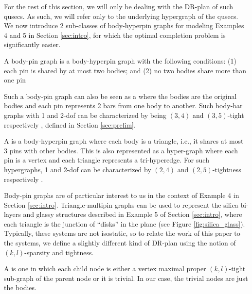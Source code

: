 For the rest of this section, we will only be dealing with the DR-plan of
such qusecs. As such, we will refer only to the underlying hypergraph of the qusecs. We now
introduce 2 sub-classes of body-hyperpin graphs for modeling Examples 4 and
5 in Section \ref{sec:intro}, for which the optimal completion problem is
significantly easier.

\begin{definition}
\label{def:body-pin}
    A body-pin graph is a body-hyperpin graph with the following conditions:
    (1) each pin is shared by at most two bodies; and
    (2) no two bodies share more than one pin

    Such a body-pin graph can also be seen as a  where
    the bodies are the original bodies and each pin represents 2 bars from
    one body to another. Such body-bar graphs with 1 and 2-dof can be
    characterized by being $(3,4)$ and $(3,5)$-tight respectively
    \cite{Lee:2007:PGA} \cite{streinu2009sparse},
defined in Section  \ref{sec:prelim}.
\end{definition}

\begin{definition}
    A  is a body-hyperpin graph where each body
    is a triangle, i.e., it shares at most 3 pins with other bodies. This is also represented as a hyper-graph where each pin is a vertex and each triangle represents a tri-hyperedge. For such hypergraphs, 1 and 2-dof can be characterized by $(2,4)$ and $(2,5)$-tightness respectively \cite{Lee:2007:PGA} \cite{streinu2009sparse}.
\end{definition}

Body-pin graphs are of particular interest to us in the context of Example 4
in Section \ref{sec:intro}. Triangle-multipin graphs can be used to
represent the silica bi-layers and glassy structures described in Example 5
of Section \ref{sec:intro}, where each triangle is the junction of ``disks''
in the plane (see Figure \ref{fig:silica_glass}). Typically, these systems
are not isostatic, so to relate the work of this paper to the systems, we
define a slightly different kind of DR-plan using the notion of
$(k,l)$-sparsity and tightness.

\begin{definition}
    A  is one in which each child node is either a vertex maximal proper $(k,l)$-tight sub-graph of the parent node or it is trivial. In our case, the trivial nodes are just the bodies.
\end{definition}

